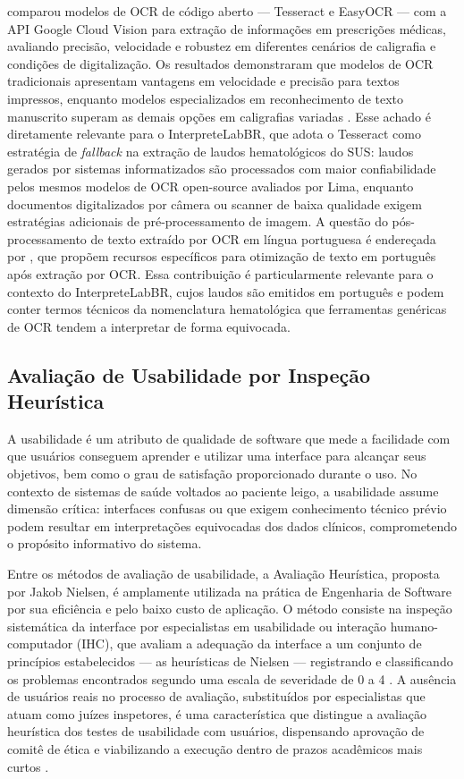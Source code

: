 \documentclass[12pt]{article}
\begin{document}
\cite{lima2024} comparou modelos de OCR de código aberto --- Tesseract e
EasyOCR --- com a API Google Cloud Vision para extração de informações em
prescrições médicas, avaliando precisão, velocidade e robustez em diferentes
cenários de caligrafia e condições de digitalização. Os resultados
demonstraram que modelos de OCR tradicionais apresentam vantagens em
velocidade e precisão para textos impressos, enquanto modelos especializados
em reconhecimento de texto manuscrito superam as demais opções em caligrafias
variadas \cite{lima2024}. Esse achado é diretamente relevante para o
InterpreteLabBR, que adota o Tesseract como estratégia de \textit{fallback}
na extração de laudos hematológicos do SUS: laudos gerados por sistemas
informatizados são processados com maior confiabilidade pelos mesmos modelos
de OCR open-source avaliados por Lima, enquanto documentos digitalizados por
câmera ou scanner de baixa qualidade exigem estratégias adicionais de
pré-processamento de imagem. A questão do
pós-processamento de texto extraído por OCR em língua portuguesa é
endereçada por \cite{osorio2025}, que propõem recursos específicos para
otimização de texto em português após extração por OCR. Essa contribuição é
particularmente relevante para o contexto do InterpreteLabBR, cujos laudos
são emitidos em português e podem conter termos técnicos da nomenclatura
hematológica que ferramentas genéricas de OCR tendem a interpretar de forma
equivocada.

\subsection{Avaliação de Usabilidade por Inspeção Heurística}

A usabilidade é um atributo de qualidade de software que mede a facilidade
com que usuários conseguem aprender e utilizar uma interface para alcançar
seus objetivos, bem como o grau de satisfação proporcionado durante o uso.
No contexto de sistemas de saúde voltados ao paciente leigo, a usabilidade
assume dimensão crítica: interfaces confusas ou que exigem conhecimento
técnico prévio podem resultar em interpretações equivocadas dos dados
clínicos, comprometendo o propósito informativo do sistema.

Entre os métodos de avaliação de usabilidade, a Avaliação Heurística,
proposta por Jakob Nielsen, é amplamente utilizada na prática de Engenharia
de Software por sua eficiência e pelo baixo custo de aplicação. O método
consiste na inspeção sistemática da interface por especialistas em
usabilidade ou interação humano-computador (IHC), que avaliam a adequação
da interface a um conjunto de princípios estabelecidos — as heurísticas de
Nielsen — registrando e classificando os problemas encontrados segundo uma
escala de severidade de 0 a 4 \cite{cardieri2018}. A ausência de usuários
reais no processo de avaliação, substituídos por especialistas que atuam
como juízes inspetores, é uma característica que distingue a avaliação
heurística dos testes de usabilidade com usuários, dispensando aprovação de
comitê de ética e viabilizando a execução dentro de prazos acadêmicos mais
curtos \cite{cardieri2018}.
\end{document}
